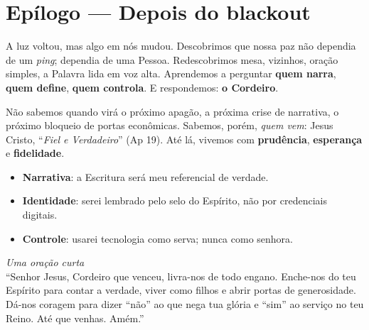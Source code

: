 
\chapter*{Epílogo — Depois do blackout}

A luz voltou, mas algo em nós mudou. Descobrimos que nossa paz não dependia de um \emph{ping}; dependia de uma Pessoa. Redescobrimos mesa, vizinhos, oração simples, a Palavra lida em voz alta. Aprendemos a perguntar \textbf{quem narra}, \textbf{quem define}, \textbf{quem controla}. E respondemos: \textbf{o Cordeiro}.

Não sabemos quando virá o próximo apagão, a próxima crise de narrativa, o próximo bloqueio de portas econômicas. Sabemos, porém, \emph{quem vem}: Jesus Cristo, ``\emph{Fiel e Verdadeiro}'' (Ap 19). Até lá, vivemos com \textbf{prudência}, \textbf{esperança} e \textbf{fidelidade}.

\begin{checklist}[title={Compromissos finais (NIC)}]
\begin{itemize}[leftmargin=*,noitemsep]
  \item \textbf{Narrativa}: a Escritura será meu referencial de verdade.
  \item \textbf{Identidade}: serei lembrado pelo selo do Espírito, não por credenciais digitais.
  \item \textbf{Controle}: usarei tecnologia como serva; nunca como senhora.
\end{itemize}
\end{checklist}

\noindent\textit{Uma oração curta}\\
``Senhor Jesus, Cordeiro que venceu, livra-nos de todo engano. Enche-nos do teu Espírito para contar a verdade, viver como filhos e abrir portas de generosidade. Dá-nos coragem para dizer ``não'' ao que nega tua glória e ``sim'' ao serviço no teu Reino. Até que venhas. Amém.''
